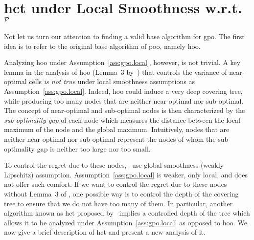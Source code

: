 \section{\gls{hct}{} under Local Smoothness w.r.t. \texorpdfstring{$\mathcal{P}$}{}}\label{sec:gpo.hct}

Not let us turn our attention to finding a valid base algorithm for \gls{gpo}. The first idea is to refer to the original base algorithm of \gls{poo}, namely \gls{hoo}. 

Analyzing \gls{hoo}{} under Assumption~\ref{ass:gpo.local}, however, is not trivial. A key lemma in the analysis of \gls{hoo} (Lemma~3 by~\citealt{bubeck2011pure}) that controls the variance of near-optimal cells \emph{is not true} under local smoothness assumptions as Assumption~\ref{ass:gpo.local}. Indeed, \gls{hoo} could induce a very deep covering tree, while producing too many nodes that are neither near-optimal nor sub-optimal. The concept of near-optimal and sub-optimal nodes is then characterized by the \emph{sub-optimality gap} of each node which measures the distance between the local maximum of the node and the global maximum. Intuitively, nodes that are neither near-optimal nor sub-optimal represent the nodes of whom the sub-optimality gap is neither too large nor too small. 

To control the regret due to these nodes,~\cite{bubeck2011pure} use global smoothness (weakly Lipschitz) assumption. Assumption~\ref{ass:gpo.local} is weaker, only local, and does not offer such comfort. If we want to control the regret due to these nodes without Lemma~3 of \citet{bubeck2011pure}, one possible way is to control the depth of the covering tree to ensure that we do not have too many of them. In particular, another algorithm known as \gls{hct} proposed by~\cite{azar2014online} implies a controlled depth of the tree which allows it to be analyzed under Assumption~\ref{ass:gpo.local} as opposed to \gls{hoo}{}. We now give a brief description of \gls{hct}{} and present a new analysis of it.

